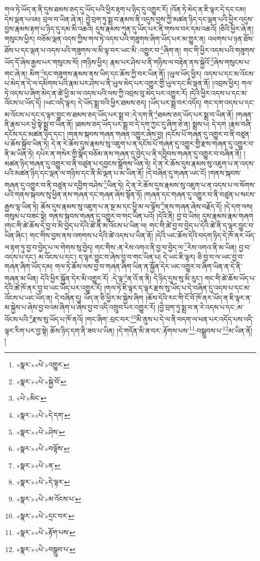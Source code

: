 གལ་ཏེ་ཡོད་ན་ནི་དུས་ཐམས་ཅད་དུ་ཡོད་པའི་ཕྱིར་རྟག་པ་ཉིད་དུ་འགྱུར་རོ། །འོན་ཏེ་མེད་ན་ཇི་ལྟར་དེ་དང་ངམ། དེས་ལྡན་པའམ། བྲལ་བ་ཡིན་ཞེ་ན། བྱེ་བྲག་ཏུ་སྨྲ་བ་རྣམས་ནི་འདུས་བྱས་ཀྱི་མཚན་ཉིད་དང་ལྡན་པའི་ཕྱིར་འདུས་བྱས་རྣམས་རྟག་པ་ཉིད་དུ་དམ་མི་འཆའི། དུས་རྣམས་ཀུན་དུ་ཡོད་པར་ནི་གསལ་བར་དམ་འཆའོ། །ཅིའི་ཕྱིར་ཞེ་ན། གསུངས་ཕྱིར། བཅོམ་ལྡན་འདས་ཀྱིས་གལ་ཏེ་འདས་པའི་གཟུགས་ཞིག་ཡོད་པར་མ་གྱུར་ན། འཕགས་པ་ཉན་ཐོས་ཐོས་པ་དང་ལྡན་པ་འདས་པའི་གཟུགས་ལ་མི་ལྟ་བར་ཡང་མི་:འགྱུར་བ་\footnote{«སྣར་»«པེ་»འགྱུར་}ཞིག་ན། གང་གི་ཕྱིར་འདས་པའི་གཟུགས་ཡོད་དོ་ཞེས་རྒྱས་པར་གསུངས་སོ། །གཉིས་ཕྱིར། རྣམ་པར་ཤེས་པ་ནི་གཉིས་ལ་བརྟེན་ནས་སྐྱེའོ་\footnote{«སྣར་»«པེ་»སྐྱེ་བོ་}ཞེས་གསུངས་པ་གང་ཞེ་ན། མིག་\footnote{«པེ་»མིང་}དང་གཟུགས་རྣམས་ནས་ཡིད་དང་ཆོས་ཀྱི་བར་ཡིན་ནོ། །ཡུལ་ཡོད་ཕྱིར། འདས་པ་དང་མ་འོངས་པ་མེད་ན་དེ་ལ་དམིགས་པའི་རྣམ་པར་ཤེས་པ་ནི་ཡུལ་མེད་པར་འགྱུར་གྱི་ཡུལ་དང་མི་ལྡན་ནོ། །འབྲས་ཕྱིར། གལ་ཏེ་འདས་པ་ཞིག་མེད་ན་ཚེ་ཕྱི་མ་ལ་འདས་པའི་ལས་ཀྱི་འབྲས་བུ་མེད་པར་འགྱུར་རོ། །དེའི་ཕྱིར་འདས་པ་དང་མ་འོངས་པ་ཡོད་དོ། །ཡང་འདི་ལྟར། དེ་ཡོད་སྨྲ་བའི་ཕྱིར་ཐམས་ཅད། །ཡོད་པར་སྨྲ་བར་འདོད། གང་དག་འདས་པ་དང་མ་འོངས་པ་དང་ད་ལྟར་བྱུང་བ་ཐམས་ཅད་ཡོད་པར་སྨྲ་བ་:དེ་དག་ནི་\footnote{«སྣར་»«པེ་»དེ་དག་}ཐམས་ཅད་ཡོད་པར་སྨྲ་བ་ཡིན་ནོ། །གཞན་ནི་རྣམ་པར་ཕྱེ་སྟེ་སྨྲ་བ་ཡིན་ནོ། །ཐམས་ཅད་ཡོད་པར་སྨྲ་བ་དེ་དག་ཀྱང་དུ་ཞིག་ཅེ་ན། སྨྲས་པ། དེ་དག །རྣམ་བཞི་དངོས་དང་མཚན་ཉིད་དང་། །གནས་སྐབས་གཞན་གཞན་འགྱུར་ཞེས་བྱ། །དངོས་པོ་གཞན་དུ་འགྱུར་བ་ནི་བཙུན་པ་ཆོས་སྐྱོབ་ཡིན་ཏེ། དེ་ན་རེ་ཆོས་དུས་རྣམས་སུ་འཇུག་པ་ན་དངོས་པོ་གཞན་དུ་འགྱུར་གྱི་རྫས་གཞན་དུ་འགྱུར་བ་ནི་མ་ཡིན་ཏེ། དཔེར་ན་གསེར་གྱི་སྣོད་བཅོམ་ནས་གཞན་དུ་བྱེད་པ་ནི་དབྱིབས་གཞན་དུ་འགྱུར་བ་བཞིན་ནོ། །མཚན་ཉིད་གཞན་དུ་འགྱུར་བ་ནི་བཙུན་པ་དབྱངས་སྒྲོགས་ཡིན་ཏེ། དེ་ན་རེ་ཆོས་དུས་རྣམས་སུ་འཇུག་པ་ན་འདས་པའི་མཚན་ཉིད་དང་ལྡན་ལ་གཉིས་དང་ནི་མི་ལྡན་པ་མ་ཡིན་ནོ། །དེ་བཞིན་དུ་གཞན་ཡང་ངོ། །གནས་སྐབས་གཞན་དུ་འགྱུར་བ་ནི་བཙུན་པ་དབྱིག་བཤེས་\footnote{«སྣར་»«པེ་»ཤེས་}ཡིན་ཏེ། དེ་ན་རེ་ཆོས་དུས་རྣམས་སུ་འཇུག་པ་ན་འདས་པ་ལ་སོགས་པའི་གནས་སྐབས་སུ་ཕྱིན་ནས་གཞན་དང་གཞན་ཞེས་སྟོན་ཏོ། །གཞན་དང་གཞན་དུ་འགྱུར་བ་ནི་བཙུན་པ་སངས་རྒྱས་ལྷ་ཡིན་ཏེ། ཆོས་དུས་རྣམས་སུ་འཇུག་པ་ན་སྔ་མ་དང་ཕྱི་མ་ལ་ལྟོས་\footnote{«སྣར་»«པེ་»བལྟོས་}ནས་གཞན་ཞེས་བརྗོད་དོ། །དེ་དག་ལས། གསུམ་པ་བཟང་སྟེ། གནས་སྐབས་གཞན་དུ་འགྱུར་བ་གང་ཡིན་པའོ། །དེའི་ནི། བྱ་བ་ཡིས། དུས་རྣམས་རྣམ་གཞག །གང་གི་ཚེ་ཆོས་དེ་བྱ་བ་མི་བྱེད་པ་དེའི་ཚེ་ནི་མ་འོངས་པ་ཡིན་ལ། གང་གི་ཚེ་བྱ་བ་བྱེད་པ་དེའི་ཚེ་ནི་ད་ལྟར་བྱུང་བ་ཡིན་ཞིང་། གང་གིས་བྱས་ནས་འགགས་པ་དེའི་ཚེ་འདས་པ་ཡིན་ནོ། །དེའི་ཡང་ཆོས་དེའི་བདག་ཉིད་དེ་ཁོ་ནར་ཡོད་ལ་རྟག་ཏུ་བྱ་བ་བྱེད་པ་ལ་གེགས་སུ་བྱེད། གང་གིས་:ན་རེས་འགའ་ནི་བྱ་བ་བྱེད་ལ་\footnote{«སྣར་»«པེ་»ན་}རེས་འགའ་ནི་མ་ཡིན། བྱ་བ་འདས་པ་དང་། མ་འོངས་པ་དང་། ད་ལྟར་བྱུང་བ་ཞེས་བྱ་བ་གང་ཡིན་པ། དེ་ཡང་ཇི་ལྟར། ཅི་བྱ་བ་ལ་ཡང་བྱ་བ་གཞན་ཞིག་ཡོད་དམ། གལ་ཏེ་ཆོས་ལས་བྱ་བ་གཞན་ཞིག་ཡིན་ན་སྐྱོན་དེར་ཡང་འགྱུར་བ་ཞིག་ཡིན་ན་དེ་ནི་གཞན་མ་ཡིན། དེའི་ཕྱིར་སྐྱོན་དེར་མི་འགྱུར་རོ། :དེ་ལྟ་\footnote{«སྣར་»«པེ་»དེ་ལྟར་}ན་འོ་ན་ནི། དེ་ཉིད་དུས་སུ་མི་རུང་། གང་གི་ཚེ་ཆོས་ཡོད་པ་དེའི་ཚེ་ཁོ་ནར་བྱ་བ་ཡང་ཡོད་པར་འགྱུར་རོ། །གལ་ཏེ་ཇི་ལྟར་ད་ལྟར་རྫས་སུ་ཡོད་པ་དེ་བཞིན་དུ་འདས་པ་དང་མ་འོངས་པ་ཡང་ཡོད་ན། དེ་བཞིན་དུ། ཡོད་ན་ཅི་ཕྱིར་མ་སྐྱེས་ཞིག །ཆོས་དེའི་རང་གི་ངོ་བོ་ཁོ་ནར་ཡོད་ན་ཇི་ལྟར་ན་མ་སྐྱེས་པ་ཞེས་བྱ་བའམ་ཞིག་པ་ཞེས་བྱ་བ་འདི་འགྲུབ་པར་འགྱུར་རོ། །བྱེ་བྲག་ཏུ་སྨྲ་བ་ན་རེ་འདས་པ་དང་:མ་འོངས་པའི་\footnote{«སྣར་»«པེ་»མ་འོངས་པ་}རྫས་སུ་ཡོད་པ་ཁོ་ནའོ། །གང་ཞིག་:བྲང་བར་\footnote{«སྣར་»«པེ་»དྲང་བར་}མི་ནུས་པ་དེ་ལ་ནི་བདག་ལ་ཕན་པར་འདོད་པས་འདི་ལྟར་རིག་པར་བྱ་སྟེ། ཆོས་ཉིད་དག་ནི་ཟབ་པ་ཡིན། །དེ་གདོན་མི་ཟ་བར་:རྟོགས་པས་\footnote{«སྣར་»«པེ་»རྟོག་པས་}:བསྒྲུབས་པ་\footnote{«སྣར་»«པེ་»བསྒྲུབ་པ་}མ་ཡིན་ནོ། །
